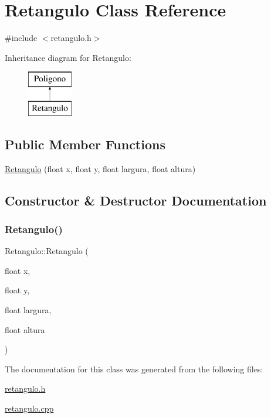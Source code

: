 \hypertarget{class_retangulo}{}\section{Retangulo Class Reference}
\label{class_retangulo}


{\ttfamily \#include $<$retangulo.\+h$>$}

Inheritance diagram for Retangulo\+:\begin{figure}[H]
\begin{center}
\leavevmode
\includegraphics[height=2.000000cm]{class_retangulo}
\end{center}
\end{figure}
\subsection*{Public Member Functions}
\begin{DoxyCompactItemize}
\item 
\hyperlink{class_retangulo_acca1dd211eefc8dc04658c943c0d1122}{Retangulo} (float x, float y, float largura, float altura)
\end{DoxyCompactItemize}


\subsection{Constructor \& Destructor Documentation}
\mbox{\label{class_retangulo_acca1dd211eefc8dc04658c943c0d1122}} 
\subsubsection{\texorpdfstring{Retangulo()}{Retangulo()}}
{\footnotesize\ttfamily Retangulo\+::\+Retangulo (\begin{DoxyParamCaption}\item[{float}]{x,  }\item[{float}]{y,  }\item[{float}]{largura,  }\item[{float}]{altura }\end{DoxyParamCaption})}



The documentation for this class was generated from the following files\+:\begin{DoxyCompactItemize}
\item 
\hyperlink{retangulo_8h}{retangulo.\+h}\item 
\hyperlink{retangulo_8cpp}{retangulo.\+cpp}\end{DoxyCompactItemize}
